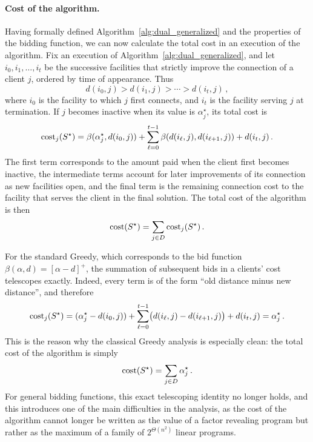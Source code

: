 \paragraph{Cost of the algorithm.} Having formally defined Algorithm~\ref{alg:dual_generalized}
and the properties of the bidding function, we can now calculate the total cost in an execution of the algorithm. Fix an execution of Algorithm~\ref{alg:dual_generalized}, and let $i_0,i_1,\ldots,i_t$ be the successive facilities that strictly improve the connection of a client $j$, ordered by time of appearance. Thus
\[
    d(i_0,j) > d(i_1,j) > \cdots > d(i_t,j)\,,
\]
where $i_0$ is the facility to which $j$ first connects, and $i_t$ is the facility serving $j$ at termination. If $j$ becomes inactive when its value is $\alpha_j^\star$, its total cost is
\[
    \textnormal{cost}_j(S^\star)
    =
    \beta(\alpha_j^\star,d(i_0,j))
    +
    \sum_{\ell=0}^{t-1}\beta(d(i_\ell,j),d(i_{\ell+1},j))
    +
    d(i_t,j)\,.
\]
The first term corresponds to the amount paid when the client first becomes inactive, the intermediate terms account for later improvements of its connection as new facilities open, and the final term is the remaining connection cost to the facility that serves the client in the final solution. The total cost of the algorithm is then
\[
    \textnormal{cost}(S^\star) = \sum_{j\in D}\textnormal{cost}_j(S^\star)\,.
\]

For the standard Greedy, which corresponds to the bid function $\beta(\alpha,d)=[\alpha-d]^+$, the summation of subsequent bids in a clients' cost telescopes exactly. Indeed, every term is of the form ``old distance minus new distance'', and therefore
\[
    \textnormal{cost}_j(S^\star)
    =
    (\alpha_j^\star-d(i_0,j))
    +
    \sum_{\ell=0}^{t-1}\bigl(d(i_\ell,j)-d(i_{\ell+1},j)\bigr)
    +
    d(i_t,j)
    =
    \alpha_j^\star\,.
\]
This is the reason why the classical Greedy analysis is especially clean: the total cost of the algorithm is simply
\[
    \textnormal{cost}(S^\star)=\sum_{j\in D}\alpha_j^\star\,.
\]
For general bidding functions, this exact telescoping identity no longer holds, and this introduces one of the main difficulties in the analysis, as the cost of the algorithm cannot longer be written as the value of a factor revealing program but rather as the maximum of a family of $2^{\Theta(n^2)}$ linear programs.



